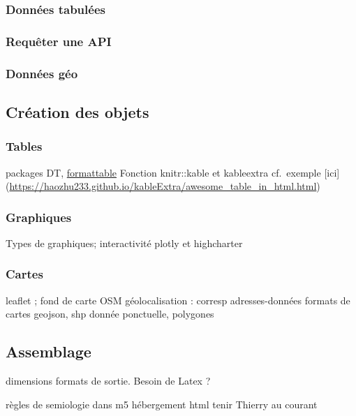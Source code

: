 \documentclass[]{article}
\begin{document}
\subsubsection{Données tabulées}\label{donnees-tabulees}

\subsubsection{Requêter une API}\label{requeter-une-api}

\subsubsection{Données géo}\label{donnees-geo}

\subsection{Création des objets}\label{creation-des-objets}

\subsubsection{Tables}\label{tables}

packages DT,
\href{https://www.littlemissdata.com/blog/prettytables}{formattable}
Fonction knitr::kable et kableextra cf.~exemple {[}ici{]}
(\url{https://haozhu233.github.io/kableExtra/awesome_table_in_html.html})

\subsubsection{Graphiques}\label{graphiques}

Types de graphiques; interactivité plotly et highcharter

\subsubsection{Cartes}\label{cartes}

leaflet ; fond de carte OSM géolocalisation : corresp adresses-données
formats de cartes geojson, shp donnée ponctuelle, polygones

\subsection{Assemblage}\label{assemblage}

dimensions formats de sortie. Besoin de Latex ?

règles de semiologie dans m5 hébergement html tenir Thierry au courant
\end{document}
